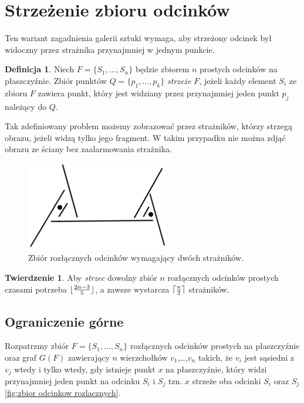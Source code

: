 \documentclass[brudnopis]{xmgr}
\DeclarePairedDelimiter\ceil{\lceil}{\rceil}
\DeclarePairedDelimiter\floor{\lfloor}{\rfloor}
\theoremstyle{definition}
\newtheorem{Twierdzenie}{Twierdzenie}
\newtheorem{Definicja}{Definicja}
\begin{document}
\section{Strzeżenie zbioru odcinków}
Ten wariant zagadnienia galerii sztuki wymaga, aby strzeżony odcinek był widoczny przez strażnika przynajmniej w jednym punkcie. 
\begin{Definicja}
Niech $F = \{S_1,\ldots,S_n\}$ będzie zbiorem $n$ prostych odcinków na płaszczyźnie. Zbiór punktów $Q = \{p_1,\ldots,p_k\}$ \emph{strzeże} $F$, jeżeli każdy element $S_i$ ze zbioru $F$ zawiera punkt, który jest widziany przez przynajmniej jeden punkt $p_j$ należący do $Q$.
\end{Definicja}
Tak zdefiniowany problem możemy zobrazować przez strażników, którzy strzegą obrazu, jeżeli widzą tylko jego fragment. W takim przypadku nie można zdjąć obrazu ze ściany bez zaalarmowania strażnika.
\begin{figure}[ht!]
 \centering
  \includegraphics{rysunki/rozlaczny_dwoch_straznikow.png}
  \caption{Zbiór rozłącznych odcinków wymagający dwóch strażników.}
\end{figure} 

\begin{Twierdzenie} \label{straznicy strzezenie} \cite{illumination}
Aby \emph{strzec} dowolny zbiór $n$ rozłącznych odcinków prostych czasami potrzeba $\floor{\frac{2n-3}{5}}$, a zawsze wystarcza $\ceil{\frac{n}{2}}$ strażników.
\end{Twierdzenie}

\subsection{Ograniczenie górne}
Rozpatrzmy zbiór $F =\{S_1,\ldots,S_n\}$ rozłącznych odcinków prostych na płaszczyźnie oraz graf $G(F)$ zawierający $n$ wierzchołków $v_1$,\ldots,$v_n$ takich, że $v_i$ jest sąsiedni z $v_j$ wtedy i tylko wtedy, gdy istnieje punkt $x$ na płaszczyźnie, który widzi przynajmniej jeden punkt na odcinku $S_i$ i $S_j$ tzn. $x$ strzeże oba odcinki $S_i$ oraz $S_j$ \ref{fig:zbior odcinkow rozlacznych}.
\end{document}
